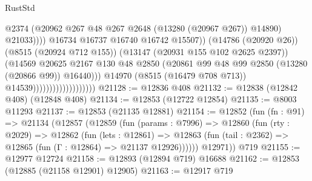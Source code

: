 \begin{lexlean}{RustStd}
\begin{coremodule}
                                                        @2374
                                                        (@20962
                                                          @267
                                                          @48
                                                          @267
                                                          @2648
                                                          (@13280 (@20967 @267))
                                                          @14890)
                                                        @21033))))
                                                @16734
                                                @16737
                                                @16740
                                                @16742
                                                @15507))
                                            (@14786 (@20920 @26))
                                            (@8515 (@20924 @712 @155))
                                            (@13147 (@20931 @155 @102 @2625 @2397))
                                            (@14569
                                              @20625
                                              @2167
                                              @130
                                              @48
                                              @2850
                                              (@20861
                                                @99
                                                @48
                                                @99
                                                @2850
                                                (@13280 (@20866 @99))
                                                @16440)))
                                          @14970
                                          (@8515 (@16479 @708 @713))
                                          @14539)))))))))))))))))))
@21128 := @12836 @408
@21132 := @12838 (@12842 @408) (@12848 @408)
@21134 := @12853 (@12722 @12854)
@21135 := @8003 @11293
@21137 := @12853 (@21135 @12881)
@21154 := @12852
    (fun (fn : @91) =>
    @21134
      (@12857
        (@12859
          (fun (params : @7996) =>
          @12860
            (fun (rty : @2029) =>
            @12862
              (fun (lets : @12861) =>
              @12863 (fun (tail : @2362) => @12865 (fun (Γ : @12864) => @21137 @12926))))))
        @12971))
    @719
@21155 := @12977 @12724
@21158 := @12893 (@12894 @719) @16688
@21162 := @12853 (@12885 (@21158 @12901) @12905)
@21163 := @12917 @719

\end{coremodule}
\end{lexlean}
